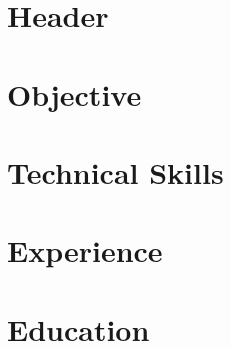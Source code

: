\documentclass{resume}
\begin{document}
\section{Header}


\section{Objective}


\section{Technical Skills}


\section{Experience}


\section{Education}

\end{document}
